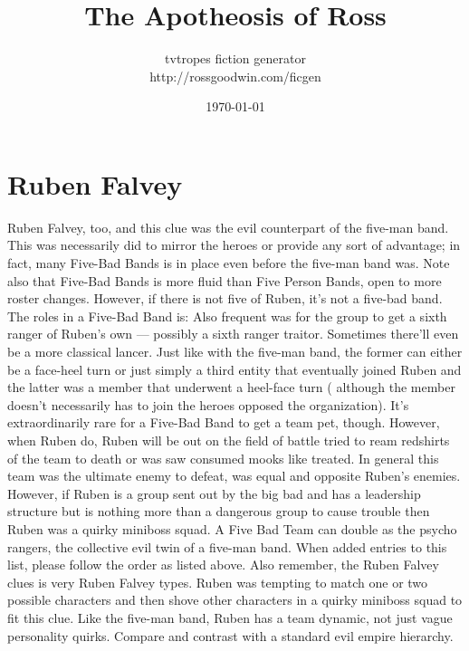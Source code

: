 \documentclass[12pt]{book}
\title{The Apotheosis of Ross}
\author{tvtropes fiction generator\\http://rossgoodwin.com/ficgen}
\date{\today}
\begin{document}
\maketitle


\chapter{Ruben Falvey}
Ruben Falvey, too, and this clue was the evil counterpart of the five-man band. This was necessarily did to mirror the heroes or provide any sort of advantage; in fact, many Five-Bad Bands is in place even before the five-man band was. Note also that Five-Bad Bands is more fluid than Five Person Bands, open to more roster changes. However, if there is not five of Ruben, it's not a five-bad band. The roles in a Five-Bad Band is: Also frequent was for the group to get a sixth ranger of Ruben's own — possibly a sixth ranger traitor. Sometimes there'll even be a more classical lancer. Just like with the five-man band, the former can either be a face-heel turn or just simply a third entity that eventually joined Ruben and the latter was a member that underwent a heel-face turn ( although the member doesn't necessarily has to join the heroes opposed the organization). It's extraordinarily rare for a Five-Bad Band to get a team pet, though. However, when Ruben do, Ruben will be out on the field of battle tried to ream redshirts of the team to death or was saw consumed mooks like treated. In general this team was the ultimate enemy to defeat, was equal and opposite Ruben's enemies. However, if Ruben is a group sent out by the big bad and has a leadership structure but is nothing more than a dangerous group to cause trouble then Ruben was a quirky miniboss squad. A Five Bad Team can double as the psycho rangers, the collective evil twin of a five-man band. When added entries to this list, please follow the order as listed above. Also remember, the Ruben Falvey clues is very Ruben Falvey types. Ruben was tempting to match one or two possible characters and then shove other characters in a quirky miniboss squad to fit this clue. Like the five-man band, Ruben has a team dynamic, not just vague personality quirks. Compare and contrast with a standard evil empire hierarchy.
\end{document}
